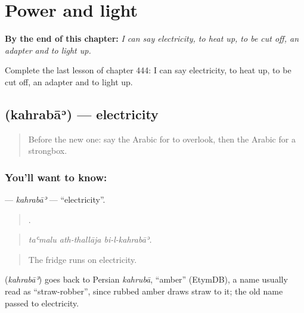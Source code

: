 
\chapter{Power and light}
\label{ch:ar-power-and-light}

\begin{chapteropening}
\textbf{By the end of this chapter:} \emph{I can say electricity, to heat up, to be cut off, an adapter and to light up.}

Complete the last lesson of chapter 444: I can say electricity, to heat up, to be cut off, an adapter and to light up.
\end{chapteropening}

\section[\texorpdfstring{\ar{كهرباء} (kahrabāʾ)}{كهرباء (kahrabāʾ)}]{ (kahrabāʾ) — electricity}

\label{lesson:AR-C444-kahraba}



\begin{quote}
Before the new one: say the Arabic for to overlook, then the Arabic for a strongbox.
\end{quote}

\subsection*{You'll want to know: }
\textbf{} — \emph{kahrabāʾ} — \textquotedblleft{}electricity\textquotedblright{}.

\begin{quote}
  .
\end{quote}

\begin{quote}
\emph{taʿmalu ath-thallāja bi-l-kahrabāʾ.}
\end{quote}

\begin{quote}
The fridge runs on electricity.
\end{quote}

\begin{cousinweb}
\textbf{} (\emph{kahrabāʾ}) goes back to Persian \emph{kahrubā}, \textquotedblleft{}amber\textquotedblright{} (EtymDB), a name usually read as \textquotedblleft{}straw-robber\textquotedblright{}, since rubbed amber draws straw to it; the old name passed to electricity.
\end{cousinweb}

